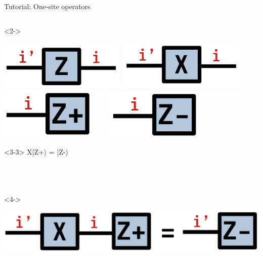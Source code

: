 \begin{frame}[fragile]{Tutorial: One-site operators}
\begin{columns}
\begin{column}{4.5cm}
\begin{onlyenv}<2->
\begin{center}
\includegraphics[width=0.45\textwidth]{
  slides/assets/Z.png
} \
\includegraphics[width=0.45\textwidth]{
  slides/assets/X.png
} \\
\vspace*{0.5cm}
\includegraphics[width=0.35\textwidth]{
  slides/assets/Zp.png
} \ \ \ \ 
\includegraphics[width=0.35\textwidth]{
  slides/assets/Zm.png
}
\end{center}
\vspace*{0.1cm}
\end{onlyenv}

\begin{onlyenv}<3-3>
X|Z+$\rangle$ = |Z-$\rangle$ \\
~\\
~\\
~\\
\end{onlyenv}

\begin{onlyenv}<4->
\vspace*{0.3cm}
\begin{center}
\includegraphics[width=1.0\textwidth]{
  slides/assets/XZp.png
}
\end{center}
\vspace*{0.2cm}
\end{onlyenv}

\end{column}

\end{columns}

\end{frame}
